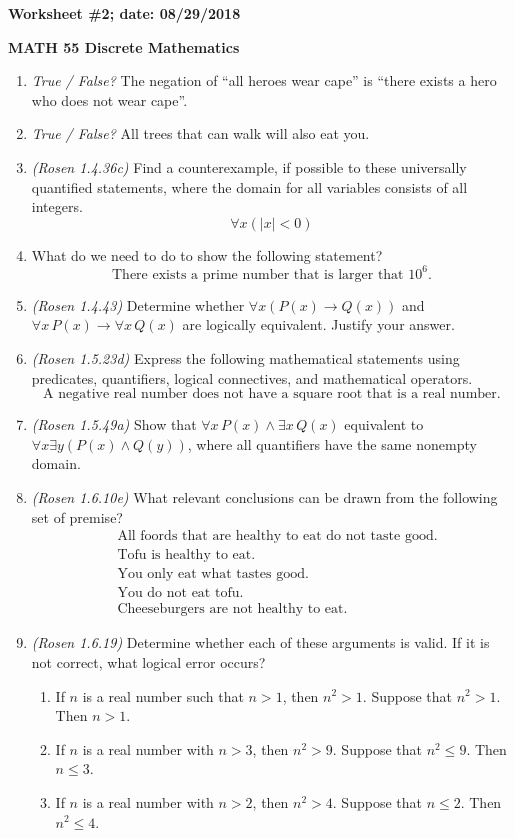 \documentclass{article}
\begin{document}
{\bf Worksheet \#2; date: 08/29/2018}

{\bf MATH 55 Discrete Mathematics}

\begin{enumerate}
\item {\em True / False?} The negation of ``all heroes wear cape'' is ``there exists a hero who does not wear cape''.

\item {\em True / False?} All trees that can walk will also eat you.

\item {\em (Rosen 1.4.36c)} Find a counterexample, if possible to these universally quantified statements, where the domain for all variables consists of all integers.
\[
\forall x(|x| < 0)
\]

\item What do we need to do to show the following statement?
\[
	\text{There exists a prime number that is larger that $10^6$.}
\]

\item {\em (Rosen 1.4.43)} Determine whether $\forall x (P(x) \to Q(x))$ and $\forall x\, P(x) \to \forall x\, Q(x)$ are logically equivalent. Justify your answer.

\item {\em (Rosen 1.5.23d)} Express the following mathematical statements using predicates, quantifiers, logical connectives, and mathematical operators.
\[
	\text{A negative real number does not have a square root that is a real number.}
\]

\item {\em (Rosen 1.5.49a)} Show that $\forall x\, P(x) \wedge \exists x\, Q(x)$ equivalent to $\forall x \exists y (P(x) \wedge Q(y))$, where all quantifiers have the same nonempty domain.

\item {\em (Rosen 1.6.10e)} What relevant conclusions can be drawn from the following set of premise?
\begin{align*}
& \text{All foords that are healthy to eat do not taste good.} \\
& \text{Tofu is healthy to eat.} \\
& \text{You only eat what tastes good.} \\
& \text{You do not eat tofu.} \\
& \text{Cheeseburgers are not healthy to eat.}
\end{align*}

\item {\em (Rosen 1.6.19)} Determine whether each of these arguments is valid. If it is not correct, what logical error occurs?
\begin{enumerate}
\item If $n$ is a real number such that $n > 1$, then $n^2 > 1$. Suppose that $n^2 > 1$. Then $n > 1$.
\item If $n$ is a real number with $n > 3$, then $n^2 > 9$. Suppose that $n^2 \le 9$. Then $n \le 3$.
\item If $n$ is a real number with $n > 2$, then $n^2 > 4$. Suppose that $n \le 2$. Then $n^2 \le 4$.
\end{enumerate}
\end{enumerate}
\end{document}
